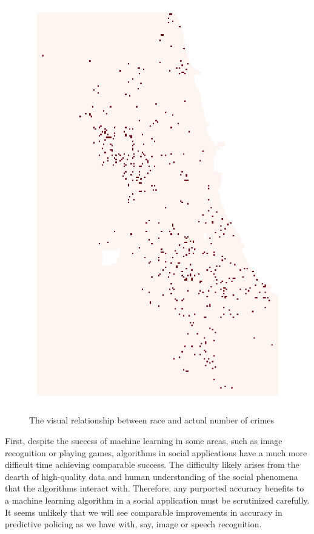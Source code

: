 \begin{figure}[bth]
{        \includegraphics[height=.45\textheight]{gfx/HeatmapActual.png}} \\
    \caption{The visual relationship between race and actual number of crimes}
    \label{fig:actual}
\end{figure}

First, despite the success of machine learning in some areas, such as image recognition or playing games, algorithms in social applications have a much more difficult time achieving comparable success. The difficulty likely arises from the dearth of high-quality data and human understanding of the social phenomena that the algorithms interact with. Therefore, any purported accuracy benefits to a machine learning algorithm in a social application must be scrutinized carefully. It seems unlikely that we will see comparable improvements in accuracy in predictive policing as we have with, say, image or speech recognition.

